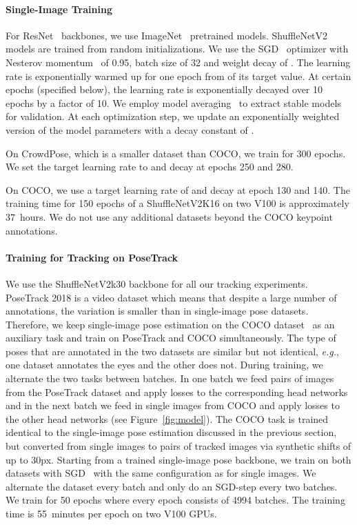\documentclass[journal]{IEEEtran}
\begin{document}
\paragraph{Single-Image Training}
For ResNet~\cite{he2016deep} backbones, we use
ImageNet~\cite{deng2009imagenet} pretrained models.
ShuffleNetV2~\cite{ma2018shufflenet}
models are trained from random initializations.
We use the SGD~\cite{bottou2010large} optimizer with Nesterov
momentum~\cite{nesterov27method} of 0.95, batch size of 32 and weight decay of .
The learning rate is exponentially warmed
up for one epoch from  of its target value. At certain
epochs (specified below), the learning
rate is exponentially decayed over 10 epochs by a factor of 10.
We employ model averaging~\cite{polyak1992acceleration,ruppert1988efficient}
to extract stable models for validation. At each optimization
step, we update an exponentially weighted version of the model parameters with a decay
constant of .


On CrowdPose, which is a smaller dataset than COCO, we train for 300 epochs.
We set the target learning rate to  and
decay at epochs 250 and 280.

On COCO, we use a target learning rate of  and decay at epoch 130 and 140.
The training time for 150 epochs of a ShuffleNetV2K16 on two V100 is
approximately 37~hours.
We do not use any additional datasets beyond the COCO keypoint
annotations.

\paragraph{Training for Tracking on PoseTrack}
We use the ShuffleNetV2k30 backbone for all our tracking experiments.
PoseTrack 2018 is a video dataset which means that despite a large number of
annotations, the variation is smaller than in single-image pose datasets.
Therefore, we keep single-image pose estimation on the
COCO dataset~\cite{lin2014microsoft} as an auxiliary task and train on
PoseTrack and COCO simultaneously.
The type of poses that are annotated in the two datasets are similar but not
identical, \textit{e.g.}, one dataset annotates the eyes and the other
does not. During training, we alternate the two tasks between batches.
In one batch we feed pairs of images from the PoseTrack dataset and apply
losses to the corresponding head networks and in the next batch we feed in single
images from COCO and apply losses to the other head networks (see Figure~\ref{fig:model}).
The COCO task is trained identical to the single-image pose estimation
discussed in the previous section, but converted from single images to
pairs of tracked images via synthetic shifts of up to 30px.
Starting from a trained single-image pose backbone,
we train on both datasets with SGD~\cite{bottou2010large} with the same
configuration as for single images. We alternate the dataset every batch
and only do an SGD-step every two batches.
We train for 50 epochs where every epoch consists of 4994 batches.
The training time is 55~minutes per epoch on two V100 GPUs.
\end{document}
